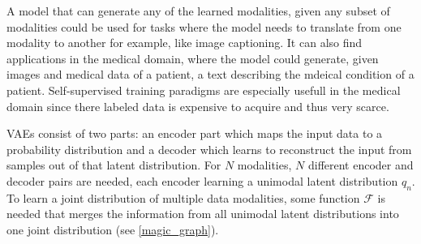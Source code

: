 A model that can generate any of the learned modalities, given any subset of modalities could be used for tasks where the model needs to translate from one modality to another for example, like image captioning.
It can also find applications in the medical domain, where the model could generate, given images and medical data of a patient, a text describing the mdeical condition of a patient.
Self-supervised training paradigms are especially usefull in the medical domain since there labeled data is expensive to acquire and thus very scarce.


VAEs consist of two parts: an encoder part which maps the input data to a probability distribution and a decoder which learns to reconstruct the input from samples out of that latent distribution.
For $N$ modalities, $N$ different encoder and decoder pairs are needed, each encoder learning a unimodal latent distribution $q_n$.
To learn a joint distribution of multiple data modalities, some function $\mathcal{F}$ is needed that merges the information from all unimodal latent distributions into one joint distribution (see \cref{magic_graph}).


